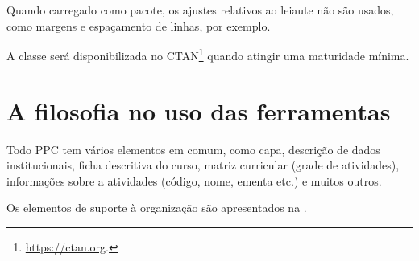 \documentclass[a4paper, 11pt]{article}
\begin{document}
Quando carregado como pacote, os ajustes relativos ao leiaute não são usados, como margens e espaçamento de linhas, por exemplo.

A classe será disponibilizada no CTAN\footnote{\url{https://ctan.org}.} quando atingir uma maturidade mínima.


\section{A filosofia no uso das ferramentas}
Todo PPC tem vários elementos em comum, como capa, descrição de dados institucionais, ficha descritiva do curso, matriz curricular (grade de atividades), informações sobre a atividades (código, nome, ementa etc.) e muitos outros.

Os elementos de suporte à organização são apresentados na .
\end{document}
